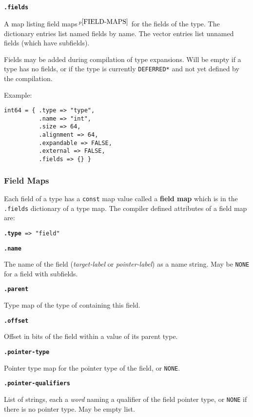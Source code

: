 \documentclass[12pt]{article}
\newcommand{\key}[1]{{\rm \bfseries #1}}
\newcommand{\ttkey}[1]{{\tt \bfseries #1}}
\newcommand{\pagnote}[1]{$\,^{p\pageref{#1}}$}
\newenvironment{indpar}[1][0.3in]%
	{\begin{list}{}%
		     {\setlength{\itemsep}{0in}%
		      \setlength{\topsep}{0in}%
		      \setlength{\parsep}{1ex}%
		      \setlength{\labelwidth}{#1}%
		      \setlength{\leftmargin}{#1}%
		      \addtolength{\leftmargin}{\labelsep}}%
	 \item}%
	{\end{list}}
\begin{document}
\ttkey{.fields}
\begin{indpar}
A map listing field maps\pagnote{FIELD-MAPS} for the fields of the type.
The dictionary entries list named fields by name.
The vector entries list unnamed fields
(which have subfields).

Fields may be added during compilation of type expansions.
Will be empty if a type has no fields, or if the type is
currently {\tt *DEFERRED*} and not yet defined by the
compilation.
\end{indpar}

Example:
\begin{indpar}\begin{verbatim}
int64 = { .type => "type",
          .name => "int",
          .size => 64,
          .alignment => 64,
          .expandable => FALSE,
          .external => FALSE,
          .fields => {} }
\end{verbatim}\end{indpar}

\subsubsection{Field Maps}
\label{FIELD-MAPS}

Each field of a type has a {\tt const} map value called
a \key{field map} which is in the {\tt .fields} dictionary of
a type map.  The compiler defined attributes of a field map are:

{\tt \ttkey{.type} => "field"}

\ttkey{.name}
\begin{indpar}
The name of the field ({\em target-label} or {\em pointer-label})
as a name string.  May be {\tt NONE} for a field with subfields.
\end{indpar}

\ttkey{.parent}
\begin{indpar}
Type map of the type of containing this field.
\end{indpar}

\ttkey{.offset}
\begin{indpar}
Offset in bits of the field within a value of its parent type.
\end{indpar}

\ttkey{.pointer-type}
\begin{indpar}
Pointer type map for the pointer type of the field,
or {\tt NONE}.
\end{indpar}

\ttkey{.pointer-qualifiers}
\begin{indpar}
List of strings, each a {\em word} naming a qualifier
of the field pointer type, or {\tt NONE} if there is no
pointer type.  May be empty list.
\end{indpar}
\end{document}
